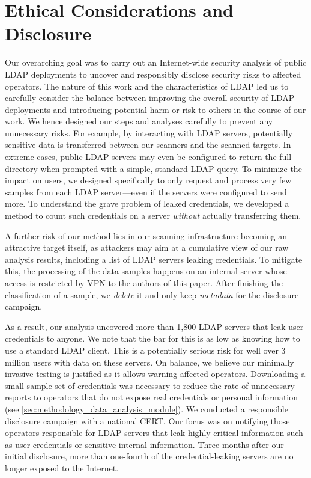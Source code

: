 \section{Ethical Considerations and Disclosure}
\label{sec:ethics}


Our overarching goal was to carry out an Internet-wide security analysis of public \acrshort{LDAP} deployments to uncover and responsibly disclose security risks to affected operators. The nature of this work and the characteristics of \acrshort{LDAP} led us to carefully consider the balance between improving the overall security of \acrshort{LDAP} deployments and introducing potential harm or risk to others in the course of our work.
We hence designed our steps and analyses carefully to prevent any unnecessary risks. 
For example, by interacting with LDAP servers, potentially sensitive data is transferred between our scanners and the scanned targets. In extreme cases, public \acrshort{LDAP} servers may even be configured to return the full directory when prompted with a simple, standard \acrshort{LDAP} query. To minimize the impact on users, we designed \mbox{\NAME} specifically to only request and process very few samples from each \acrshort{LDAP} server---even if the servers were configured to send more. To understand the grave problem of leaked credentials, we developed a method to count such credentials on a server \textit{without} actually transferring them.

A further risk of our method lies in our scanning infrastructure becoming an attractive target itself, as attackers may aim at a cumulative view of our raw analysis results, including a list of \acrshort{LDAP} servers leaking credentials. To mitigate this, the processing of the data samples happens on an internal server whose access is restricted by VPN to the authors of this paper. After finishing the classification of a sample, we \textit{delete} it and only keep \textit{metadata} for the disclosure campaign.

As a result, our analysis uncovered more than 1,800 \acrshort{LDAP} servers that leak user credentials to anyone. We note that the bar for this is as low as knowing how to use a standard \acrshort{LDAP} client.
This is a potentially serious risk for well over 3 million users with data on these servers. On balance, we believe our minimally invasive testing is justified as it allows warning affected operators. Downloading a small sample set of credentials was necessary to reduce the rate of unnecessary reports to operators that do not expose real credentials or personal information (see \cref{sec:methodology_data_analysis_module}). We conducted a responsible disclosure campaign with a national CERT. Our focus was on notifying those operators responsible for LDAP servers that leak highly critical information such as user credentials or sensitive internal information. Three months after our initial disclosure, more than one-fourth of the credential-leaking servers are no longer exposed to the Internet.
 

